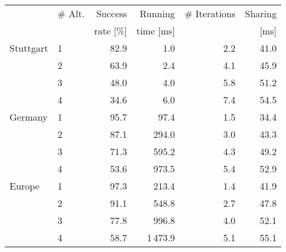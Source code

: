 \begin{tabular}{llrrrr}
\toprule
 & \# Alt. & Success   & Running   & \# Iterations & Sharing \\
 &         & rate [\%] & time [ms] &               &    [ms] \\
\midrule
Stuttgart & 1 &     82.9 &              1.0 &        2.2 &             41.0 \\
       & 2 &     63.9 &              2.4 &        4.1 &             45.9 \\
       & 3 &     48.0 &              4.0 &        5.8 &             51.2 \\
       & 4 &     34.6 &              6.0 &        7.4 &             54.5 \\
\addlinespace Germany & 1 &     95.7 &             97.4 &        1.5 &             34.4 \\
       & 2 &     87.1 &            294.0 &        3.0 &             43.3 \\
       & 3 &     71.3 &            595.2 &        4.3 &             49.2 \\
       & 4 &     53.6 &            973.5 &        5.4 &             52.9 \\
\addlinespace Europe & 1 &     97.3 &            213.4 &        1.4 &             41.9 \\
       & 2 &     91.1 &            548.8 &        2.7 &             47.8 \\
       & 3 &     77.8 &            996.8 &        4.0 &             52.1 \\
       & 4 &     58.7 &           1\,473.9 &        5.1 &             55.1 \\
\bottomrule
\end{tabular}

